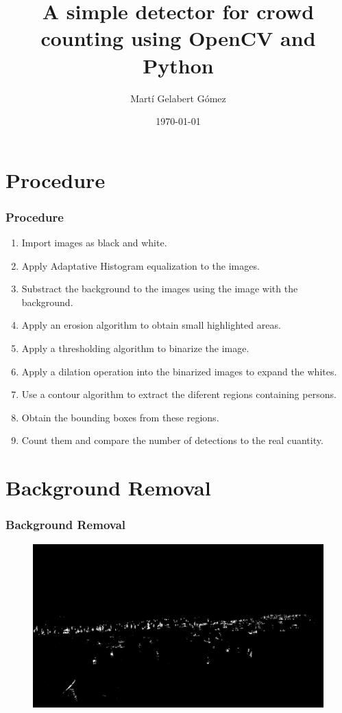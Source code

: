 \documentclass{beamer}
\title{A simple detector for crowd counting using OpenCV and Python}
\author{Martí Gelabert Gómez}
\institute{University of the Balearic Islands}
\date{\today}
\begin{document}
\frame{\titlepage}

\frame{\tableofcontents}

\section*{Procedure}
\begin{frame}
\frametitle{Procedure}
\begin{enumerate}
    \item Import images as black and white.
    \item Apply Adaptative Histogram equalization to the images.
    \item Substract the background to the images using the image with the background.
    \item Apply an erosion algorithm to obtain small highlighted areas.
    \item Apply a thresholding algorithm to binarize the image.
    \item Apply a dilation operation into the binarized images to expand the whites.
    \item Use a contour algorithm to extract the diferent regions containing persons.
    \item Obtain the bounding boxes from these regions.
    \item Count them and compare the number of detections to the real cuantity.
\end{enumerate}\end{frame}


\section{Background Removal}
    \begin{frame}
        \frametitle{Background Removal}
        \begin{figure}
            \centering
            \includegraphics[width=\textwidth]{../gen/bin/1660320000.jpg}
        \end{figure}
    \end{frame}
\end{document}

